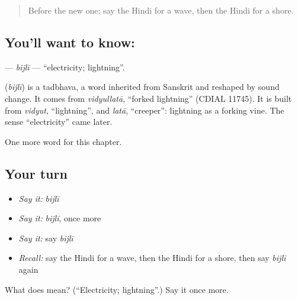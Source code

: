 \label{lesson:HI-C144-bijli}



\begin{quote}
Before the new one: say the Hindi for a wave, then the Hindi for a shore.
\end{quote}

\subsection*{You'll want to know: }
\textbf{} — \emph{bijlī} — \textquotedblleft{}electricity; lightning\textquotedblright{}.

\begin{cousinweb}
\textbf{} (\emph{bijlī}) is a tadbhava, a word inherited from Sanskrit and reshaped by sound change. It comes from \emph{vidyullatā}, \textquotedblleft{}forked lightning\textquotedblright{} (CDIAL 11745). It is built from \emph{vidyut}, \textquotedblleft{}lightning\textquotedblright{}, and \emph{latā}, \textquotedblleft{}creeper\textquotedblright{}: lightning as a forking vine. The sense \textquotedblleft{}electricity\textquotedblright{} came later.
\end{cousinweb}

\begin{grammarlens}[title={What you've built}]
One more word for this chapter.
\end{grammarlens}

\subsection*{Your turn}
\begin{itemize}
\raggedright
  \item \emph{Say it:} \emph{bijlī}
  \item \emph{Say it:} \emph{bijlī}, once more
  \item \emph{Say it:} say \emph{bijlī}
  \item \emph{Recall:} say the Hindi for a wave, then the Hindi for a shore, then say \emph{bijlī} again
\end{itemize}

\begin{tcolorbox}[breakable,colback=teal!4,colframe=teal!35!black,title={Before you move on}]
What does  mean? (\textquotedblleft{}Electricity; lightning\textquotedblright{}.) Say it once more.
\end{tcolorbox}
